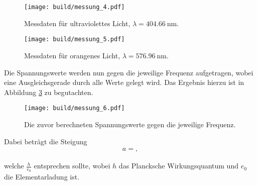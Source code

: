 \begin{figure}
  \centering
  \texttt{[image: build/messung\_4.pdf]}
  \caption{Messdaten für ultraviolettes Licht, $\lambda = \SI{404,66}{\nano\metre}$.}
  \label{plot:4}
\end{figure}

\begin{figure}
  \centering
  \texttt{[image: build/messung\_5.pdf]}
  \caption{Messdaten für orangenes Licht, $\lambda = \SI{576,96}{\nano\metre}$.}
  \label{plot:5}
\end{figure}



Die Spannungswerte werden nun gegen die jeweilige Frequenz aufgetragen, wobei eine Ausgleichsgerade durch alle Werte gelegt wird.
Das Ergebnis hierzu ist in Abbildung \ref{plot:6} zu begutachten.

\begin{figure}
  \centering
  \texttt{[image: build/messung\_6.pdf]}
  \caption{Die zuvor berechneten Spannungswerte gegen die jeweilige Frequenz.}
  \label{plot:6}
\end{figure}

Dabei beträgt die Steigung
\begin{align*}
  a = ,
\end{align*}

welche $\frac{h}{e_0}$ entsprechen sollte, wobei $h$ das Plancksche Wirkungsquantum und $e_0$ die Elementarladung ist.
